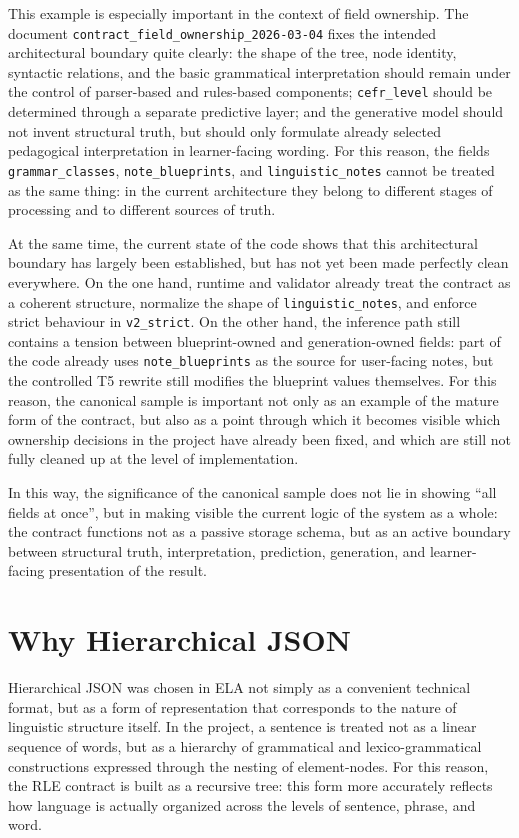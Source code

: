 \documentclass[12pt,a4paper,oneside]{report}
\begin{document}
This example is especially important in the context of field ownership. The document \texttt{contract\_field\_ownership\_2026-03-04} fixes the intended architectural boundary quite clearly: the shape of the tree, node identity, syntactic relations, and the basic grammatical interpretation should remain under the control of parser-based and rules-based components; \texttt{cefr\_level} should be determined through a separate predictive layer; and the generative model should not invent structural truth, but should only formulate already selected pedagogical interpretation in learner-facing wording. For this reason, the fields \texttt{grammar\_classes}, \texttt{note\_blueprints}, and \texttt{linguistic\_notes} cannot be treated as the same thing: in the current architecture they belong to different stages of processing and to different sources of truth.

At the same time, the current state of the code shows that this architectural boundary has largely been established, but has not yet been made perfectly clean everywhere. On the one hand, runtime and validator already treat the contract as a coherent structure, normalize the shape of \texttt{linguistic\_notes}, and enforce strict behaviour in \texttt{v2\_strict}. On the other hand, the inference path still contains a tension between blueprint-owned and generation-owned fields: part of the code already uses \texttt{note\_blueprints} as the source for user-facing notes, but the controlled T5 rewrite still modifies the blueprint values themselves. For this reason, the canonical sample is important not only as an example of the mature form of the contract, but also as a point through which it becomes visible which ownership decisions in the project have already been fixed, and which are still not fully cleaned up at the level of implementation.

In this way, the significance of the canonical sample does not lie in showing “all fields at once”, but in making visible the current logic of the system as a whole: the contract functions not as a passive storage schema, but as an active boundary between structural truth, interpretation, prediction, generation, and learner-facing presentation of the result.

\section{Why Hierarchical JSON}
Hierarchical JSON was chosen in ELA not simply as a convenient technical format, but as a form of representation that corresponds to the nature of linguistic structure itself. In the project, a sentence is treated not as a linear sequence of words, but as a hierarchy of grammatical and lexico-grammatical constructions expressed through the nesting of element-nodes. For this reason, the RLE contract is built as a recursive tree: this form more accurately reflects how language is actually organized across the levels of sentence, phrase, and word.
\end{document}
